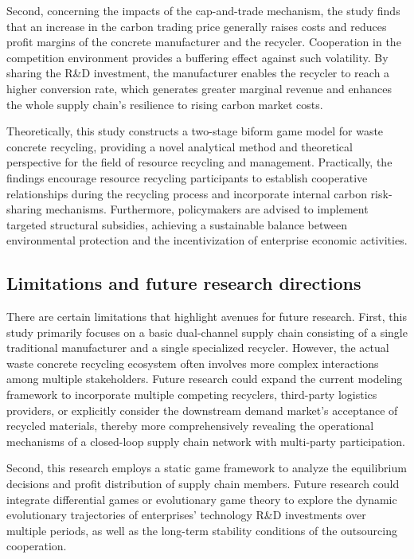 \documentclass[authoryear,preprint,review,times,10pt]{elsarticle}
\begin{document}
Second, concerning the impacts of the cap-and-trade mechanism, the study finds that an increase in the carbon trading price generally raises costs and reduces profit margins of the concrete manufacturer and the recycler. Cooperation in the competition environment provides a buffering effect against such volatility. By sharing the R\&D investment, the manufacturer enables the recycler to reach a higher conversion rate, which generates greater marginal revenue and enhances the whole supply chain's resilience to rising carbon market costs.

Theoretically, this study constructs a two-stage biform game model for waste concrete recycling, providing a novel analytical method and theoretical perspective for the field of resource recycling and management. Practically, the findings encourage resource recycling participants to establish cooperative relationships during the recycling process and incorporate internal carbon risk-sharing mechanisms. Furthermore, policymakers are advised to implement targeted structural subsidies, achieving a sustainable balance between environmental protection and the incentivization of enterprise economic activities.

\subsection{Limitations and future research directions}
There are certain limitations that highlight avenues for future research. First, this study primarily focuses on a basic dual-channel supply chain consisting of a single traditional manufacturer and a single specialized recycler. However, the actual waste concrete recycling ecosystem often involves more complex interactions among multiple stakeholders. Future research could expand the current modeling framework to incorporate multiple competing recyclers, third-party logistics providers, or explicitly consider the downstream demand market's acceptance of recycled materials, thereby more comprehensively revealing the operational mechanisms of a closed-loop supply chain network with multi-party participation.

Second, this research employs a static game framework to analyze the equilibrium decisions and profit distribution of supply chain members. Future research could integrate differential games or evolutionary game theory to explore the dynamic evolutionary trajectories of enterprises' technology R\&D investments over multiple periods, as well as the long-term stability conditions of the outsourcing cooperation.
\end{document}
